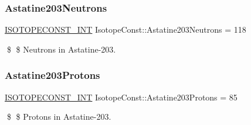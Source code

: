\subsubsection{\texorpdfstring{Astatine203\+Neutrons}{Astatine203Neutrons}}
{\footnotesize\ttfamily \mbox{\hyperlink{group___isotope_const-_macros_ga5f18360b3e99483a35c32d789e62621c}{I\+S\+O\+T\+O\+P\+E\+C\+O\+N\+S\+T\+\_\+\+I\+NT}} Isotope\+Const\+::\+Astatine203\+Neutrons = 118}

\$ \$ Neutrons in Astatine-\/203. \mbox{\label{group___isotope_const-_astatine-_at203_ga1f46acb9489938ca889dac1f53b1476c}} 
\subsubsection{\texorpdfstring{Astatine203\+Protons}{Astatine203Protons}}
{\footnotesize\ttfamily \mbox{\hyperlink{group___isotope_const-_macros_ga5f18360b3e99483a35c32d789e62621c}{I\+S\+O\+T\+O\+P\+E\+C\+O\+N\+S\+T\+\_\+\+I\+NT}} Isotope\+Const\+::\+Astatine203\+Protons = 85}

\$ \$ Protons in Astatine-\/203. 